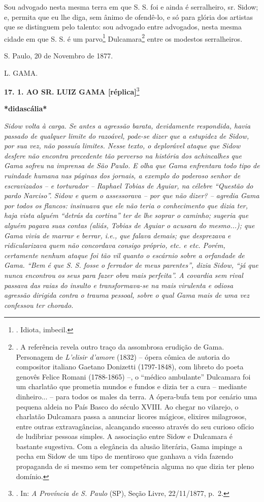Sou advogado nesta mesma terra em que S. S. foi e ainda é serralheiro,
sr. Sidow; e, permita que eu lhe diga, sem ânimo de ofendê-lo, e só para
glória dos artistas que se distinguem pelo talento: sou advogado entre
advogados, nesta mesma cidade em que S. S. é um parvo\footnote{. Idiota,
  imbecil.} Dulcamara\footnote{. A referência revela outro traço da
  assombrosa erudição de Gama. Personagem de \emph{L'elisir d'amore}
  (1832) -- ópera cômica de autoria do compositor italiano Gaetano
  Donizetti (1797-1848), com libreto do poeta genovês Felice Romani
  (1788-1865) --, o ``médico ambulante'' Dulcamara foi um charlatão que
  prometia mundos e fundos e dizia ter a cura -- mediante dinheiro... --
  para todos os males da terra. A ópera-bufa tem por cenário uma pequena
  aldeia no País Basco do século XVIII. Ao chegar no vilarejo, o
  charlatão Dulcamara passa a anunciar licores mágicos, elixires
  milagrosos, entre outras extravagâncias, alcançando sucesso através do
  seu curioso ofício de ludibriar pessoas simples. A associação entre
  Sidow e Dulcamara é bastante sugestiva. Com a elegância da alusão
  literária, Gama impinge a pecha em Sidow de um tipo de mentiroso que
  ganhava a vida fazendo propaganda de si mesmo sem ter competência
  alguma no que dizia ter pleno domínio.} entre os modestos
serralheiros.

S. Paulo, 20 de Novembro de 1877.

L. GAMA.

\textbf{17. 1. AO SR. LUIZ GAMA {[}réplica{]}}\footnote{. In: \emph{A
  Província de S. Paulo} (SP), Seção Livre, 22/11/1877, p.~2.}

\textbf{*didascália*}

\emph{Sidow volta à carga. Se antes a agressão barata, devidamente
respondida, havia passado de qualquer limite do razoável, pode-se dizer
que a estupidez de Sidow, por sua vez, não possuía limites. Nesse texto,
o deplorável ataque que Sidow desfere não encontra precedente tão
perverso na história dos achincalhes que Gama sofreu na imprensa de São
Paulo. E olha que Gama enfrentara todo tipo de ruindade humana nas
páginas dos jornais, a exemplo do poderoso senhor de escravizados -- e
torturador -- Raphael Tobias de Aguiar, na célebre ``\emph{Questão do
pardo Narciso}''. Sidow e quem o assessorava -- por que não dizer? --
agredia Gama por todos os flancos: insinuava que ele não teria o
conhecimento que dizia ter, haja vista alguém ``detrás da cortina'' ter
de lhe soprar o caminho; sugeria que alguém pagava suas contas (aliás,
Tobias de Aguiar o acusara do mesmo...); que Gama vivia de marrar e
berrar, i.e., que falava demais; que desprezava e ridicularizava quem
não concordava consigo próprio, etc. e etc. Porém, certamente nenhum
ataque foi tão vil quanto o escárnio sobre a orfandade de Gama. ``Bem é
que S. S. fosse o ferrador de meus parentes'', dizia Sidow, ``já que
nunca encontrou os seus para fazer obra mais perfeita''. A covardia sem
rival passava das raias do insulto e transformava-se na mais virulenta e
odiosa agressão dirigida contra o trauma pessoal, sobre o qual Gama mais
de uma vez confessou ter chorado. }

